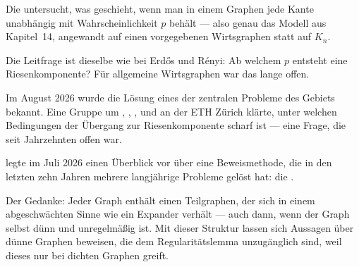 \begin{forschung}
Die  untersucht, was geschieht, wenn man in einem Graphen jede Kante unabhängig mit Wahrscheinlichkeit $p$ behält --- also genau das Modell aus Kapitel~14, angewandt auf einen vorgegebenen Wirtsgraphen statt auf $K_n$.

Die Leitfrage ist dieselbe wie bei Erdős und Rényi: Ab welchem $p$ entsteht eine Riesenkomponente? Für allgemeine Wirtsgraphen war das lange offen.

Im August 2026 wurde die Lösung eines der zentralen Probleme des Gebiets bekannt. Eine Gruppe um , , ,  und  an der ETH Zürich klärte, unter welchen Bedingungen der Übergang zur Riesenkomponente scharf ist --- eine Frage, die seit Jahrzehnten offen war.

\begin{center}
\begin{minipage}{0.88\textwidth}
\end{minipage}
\end{center}
\end{forschung}

\begin{forschung}
 legte im Juli 2026 einen Überblick vor über eine Beweismethode, die in den letzten zehn Jahren mehrere langjährige Probleme gelöst hat: die .

Der Gedanke: Jeder Graph enthält einen Teilgraphen, der sich in einem abgeschwächten Sinne wie ein Expander verhält --- auch dann, wenn der Graph selbst dünn und unregelmäßig ist. Mit dieser Struktur lassen sich Aussagen über dünne Graphen beweisen, die dem Regularitätslemma unzugänglich sind, weil dieses nur bei dichten Graphen greift.

\begin{center}
\begin{minipage}{0.88\textwidth}
\end{minipage}
\end{center}
\end{forschung}

